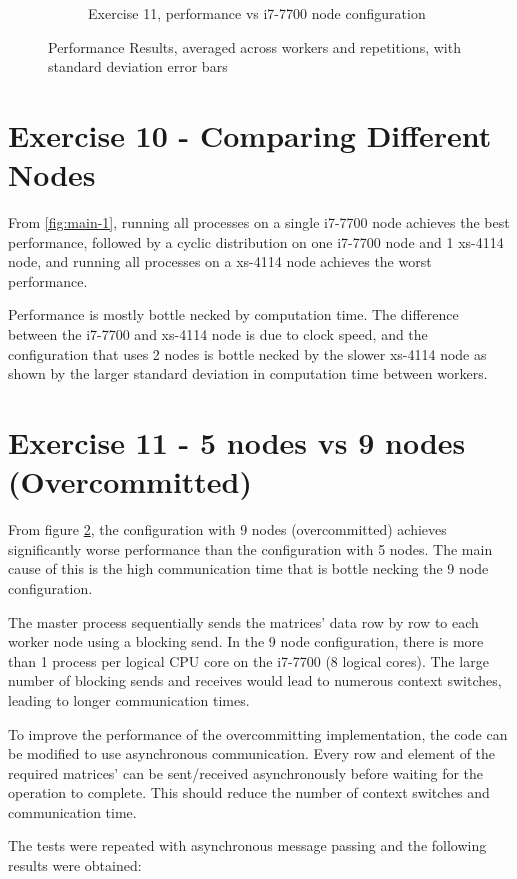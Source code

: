 \documentclass[11pt]{article}
\begin{document}
\begin{figure}[H]
\begin{subfigure}[t]{0.45\textwidth}
    \caption{Exercise 11, performance vs i7-7700 node configuration}
    \label{fig:main-2}
  \end{subfigure}
  \caption{Performance Results, averaged across workers and repetitions, with standard deviation error bars}
\end{figure}

\section{Exercise 10 - Comparing Different Nodes}
From \ref{fig:main-1},
running all processes on a single i7-7700 node achieves the best performance,
followed by a cyclic distribution on one i7-7700 node and 1 xs-4114 node,
and running all processes on a xs-4114 node achieves the worst performance.

Performance is mostly bottle necked by computation time.
The difference between the i7-7700 and xs-4114 node is due to clock speed,
and the configuration that uses 2 nodes is bottle necked by the slower xs-4114 node
as shown by the larger standard deviation in computation time between workers.

\section{Exercise 11 - 5 nodes vs 9 nodes (Overcommitted)}

From figure \ref{fig:main-2},
the configuration with 9 nodes (overcommitted) achieves significantly worse performance than the configuration with 5 nodes.
The main cause of this is the high communication time that is bottle necking the 9 node configuration.

The master process sequentially sends the matrices' data row by row to each worker node using a blocking send.
In the 9 node configuration, there is more than 1 process per logical CPU core on the i7-7700 (8 logical cores).
The large number of blocking sends and receives would lead to numerous context switches, leading to longer communication times.

To improve the performance of the overcommitting implementation, the code can be modified to use asynchronous communication.
Every row and element of the required matrices' can be sent/received asynchronously before waiting for the operation to complete.
This should reduce the number of context switches and communication time.

The tests were repeated with asynchronous message passing and the following results were obtained:
\end{document}
